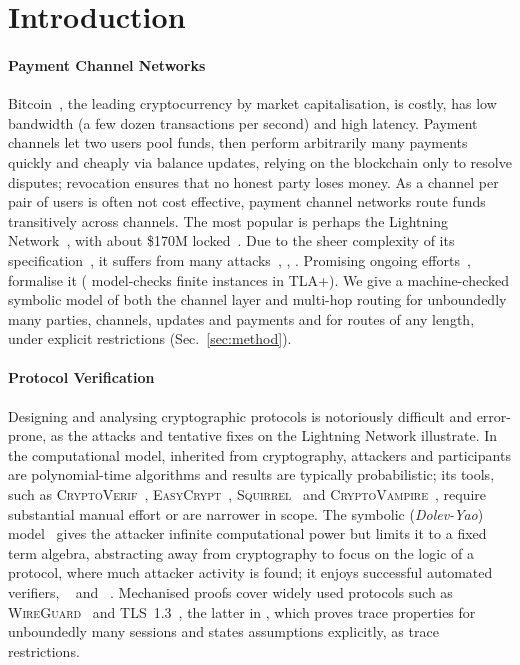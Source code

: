 \section{Introduction}\label{sec:intro}

\paragraph{Payment Channel Networks}
Bitcoin~\cite{nakamoto2008}, the leading cryptocurrency by market
capitalisation, is costly, has low bandwidth (a few dozen transactions per
second) and high latency. Payment channels let two users pool funds, then
perform arbitrarily many payments quickly and cheaply via balance updates,
relying on the blockchain only to resolve disputes; revocation ensures that no
honest party loses money. As a channel per pair of users is often not cost
effective, payment channel networks route funds transitively across channels.
The most popular is perhaps the Lightning Network~\cite{poon2016}, with about
\$170M locked~\cite{oneml2026}. Due to the sheer complexity of its
specification~\cite{bolts}, it suffers from many attacks~\cite{tikhomirov2020},
\cite{malavolta2019}, \cite{aumayr2021}. Promising ongoing
efforts~\cite{grundmann2026}, \cite{litos2026} formalise it
(\cite{grundmann2026} model-checks finite instances in TLA+). We give a
machine-checked symbolic model of both the channel layer and
multi-hop routing for unboundedly many parties, channels, updates and payments
and for routes of any length, under explicit restrictions
(Sec.~\ref{sec:method}).

\paragraph{Protocol Verification}
Designing and analysing cryptographic protocols is notoriously difficult and
error-prone, as the attacks and tentative fixes on the Lightning Network
illustrate. In the computational model, inherited from cryptography, attackers
and participants are polynomial-time algorithms and results are typically
probabilistic; its tools, such as \textsc{CryptoVerif}~\cite{blanchet2006},
\textsc{EasyCrypt}~\cite{barthe2011}, \textsc{Squirrel}~\cite{baelde2021} and
\textsc{CryptoVampire}~\cite{jeanteur2024}, require substantial manual effort
or are narrower in scope. The symbolic (\emph{Dolev-Yao}) model~\cite{dolevyao1983}
gives the attacker infinite computational power but limits it to a fixed term
algebra, abstracting away from cryptography to focus on the logic of a
protocol, where much attacker activity is found; it enjoys
successful automated verifiers, \proverif~\cite{blanchet2001} and
\tamarin~\cite{meier2013}. Mechanised proofs cover widely used protocols such
as \textsc{WireGuard}~\cite{lipp2019} and TLS~1.3~\cite{cremers2017}, the
latter in \tamarin, which proves trace properties for unboundedly many sessions
and states assumptions explicitly, as trace restrictions.

